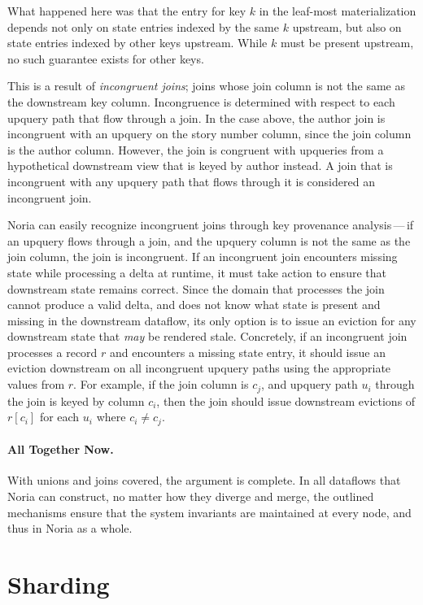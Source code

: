 What happened here was that the entry for key $k$ in the leaf-most
materialization depends not only on state entries indexed by the same $k$
upstream, but also on state entries indexed by other keys upstream. While $k$
must be present upstream, no such guarantee exists for other keys.

This is a result of \textit{incongruent joins}; joins whose join column is not
the same as the downstream key column. Incongruence is determined with respect
to each upquery path that flow through a join. In the case above, the author
join is incongruent with an upquery on the story number column, since the join
column is the author column. However, the join is congruent with upqueries from
a hypothetical downstream view that is keyed by author instead. A join that is
incongruent with any upquery path that flows through it is considered an
incongruent join.

Noria can easily recognize incongruent joins through key provenance
analysis\,---\,if an upquery flows through a join, and the upquery column is not
the same as the join column, the join is incongruent. If an incongruent join
encounters missing state while processing a delta at runtime, it must take
action to ensure that downstream state remains correct. Since the domain that
processes the join cannot produce a valid delta, and does not know what state is
present and missing in the downstream dataflow, its only option is to issue an
eviction for any downstream state that \emph{may} be rendered stale. Concretely,
if an incongruent join processes a record $r$ and encounters a missing state
entry, it should issue an eviction downstream on all incongruent upquery paths
using the appropriate values from $r$. For example, if the join column is $c_j$,
and upquery path $u_i$ through the join is keyed by column $c_i$, then the join
should issue downstream evictions of $r[c_i]$ for each $u_i$ where $c_i \neq
c_j$.

\paragraph{All Together Now.}
%
With unions and joins covered, the argument is complete. In all dataflows that
Noria can construct, no matter how they diverge and merge, the outlined
mechanisms ensure that the system invariants are maintained at every node, and
thus in Noria as a whole.

\section{Sharding}
\label{s:challenge:sharding}

